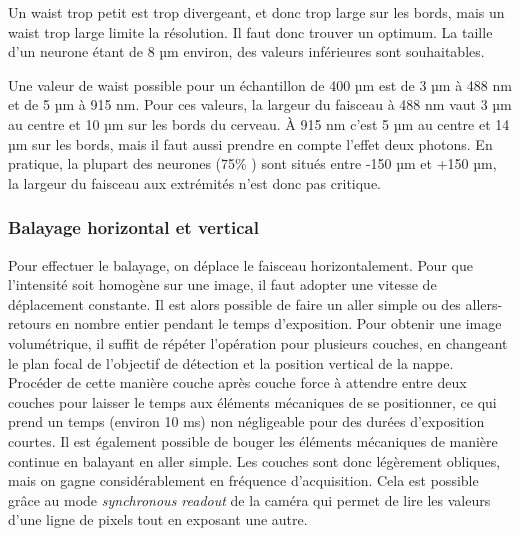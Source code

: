 
Un waist trop petit est trop divergeant, et donc trop large sur les bords, mais un waist trop large limite la résolution. Il faut donc trouver un optimum. La taille d'un neurone étant de 8 µm environ, des valeurs inférieures sont souhaitables.

Une valeur de waist possible pour un échantillon de 400 µm est de 3 µm à 488 nm et de 5 µm à 915 nm. Pour ces valeurs, la largeur du faisceau à 488 nm vaut 3 µm au centre et 10 µm sur les bords du cerveau. À 915 nm c'est 5 µm au centre et 14 µm sur les bords, mais il faut aussi prendre en compte l'effet deux photons. En pratique, la plupart des neurones (75\% \cite{panier_fast_2013}) sont situés entre -150 µm et +150 µm, la largeur du faisceau aux extrémités n'est donc pas critique.

\subsubsection{Balayage horizontal et vertical}

Pour effectuer le balayage, on déplace le faisceau horizontalement. Pour que l'intensité soit homogène sur une image, il faut adopter une vitesse de déplacement constante. Il est alors possible de faire un aller simple ou des allers-retours en nombre entier pendant le temps d'exposition. Pour obtenir une image volumétrique, il suffit de répéter l'opération pour plusieurs couches, en changeant le plan focal de l'objectif de détection et la position vertical de la nappe. Procéder de cette manière couche après couche force à attendre entre deux couches pour laisser le temps aux éléments mécaniques de se positionner, ce qui prend un temps (environ 10 ms) non négligeable pour des durées d'exposition courtes. Il est également possible de bouger les éléments mécaniques de manière continue en balayant en aller simple. Les couches sont donc légèrement obliques, mais on gagne considérablement en fréquence d'acquisition. Cela est possible grâce au mode \emph{synchronous readout} de la caméra qui permet de lire les valeurs d'une ligne de pixels tout en exposant une autre.


